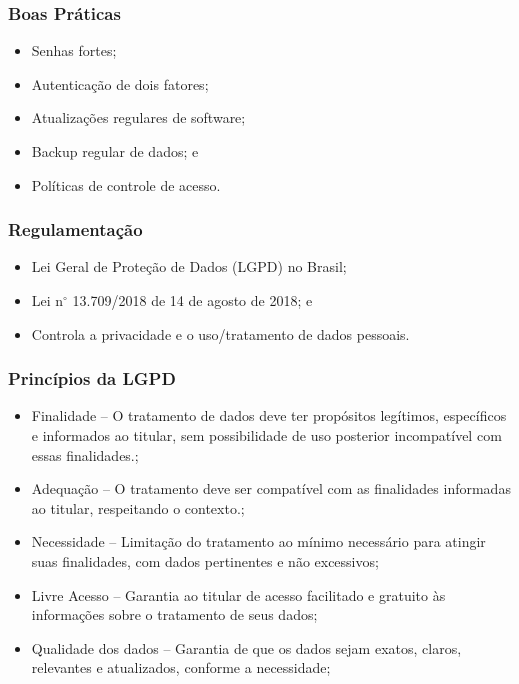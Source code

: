 \documentclass[aspectratio=169]{beamer} %
\begin{document}
\begin{frame}
	\frametitle{Boas Práticas}
	
	\begin{itemize}
		\item Senhas fortes;
		\item Autenticação de dois fatores;
		\item Atualizações regulares de software;
		\item Backup regular de dados; e
		\item Políticas de controle de acesso.
	\end{itemize}
\end{frame}

\begin{frame}
	\frametitle{Regulamentação}
	
	\begin{itemize}
		\item Lei Geral de Proteção de Dados (LGPD) no Brasil;
		\item Lei n$^{\circ}$ 13.709/2018 de 14 de agosto de 2018; e
		\item Controla a privacidade e o uso/tratamento de dados pessoais.
	\end{itemize}
\end{frame}

\begin{frame}
	\frametitle{Princípios da LGPD}
	
	\begin{itemize}
		\item Finalidade -- O tratamento de dados deve ter propósitos legítimos, específicos e informados ao titular, sem possibilidade de uso posterior incompatível com essas finalidades.;
		\item Adequação -- O tratamento deve ser compatível com as finalidades informadas ao titular, respeitando o contexto.;
		\item Necessidade -- Limitação do tratamento ao mínimo necessário para atingir suas finalidades, com dados pertinentes e não excessivos;
		\item Livre Acesso -- Garantia ao titular de acesso facilitado e gratuito às informações sobre o tratamento de seus dados;
		\item Qualidade dos dados -- Garantia de que os dados sejam exatos, claros, relevantes e atualizados, conforme a necessidade;
	\end{itemize}
\end{frame}
\end{document}
